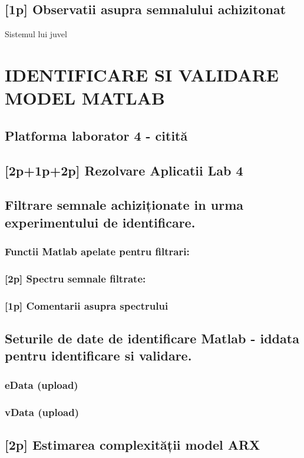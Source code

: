 \documentclass[12pt,english]{article}
\begin{document}
\subsection { [1p] Observatii asupra semnalului achizitonat }
Sistemul lui juvel

\section { IDENTIFICARE SI VALIDARE MODEL MATLAB }
\subsection { Platforma laborator 4 - citită                                  }
\subsection { [2p+1p+2p] Rezolvare Aplicatii Lab 4 }
\subsection { Filtrare semnale achiziționate in urma experimentului de identificare. }
\subsubsection { Functii Matlab apelate pentru filtrari: }
\subsubsection { [2p] Spectru semnale filtrate: }
\subsubsection { [1p] Comentarii asupra spectrului }
\subsection { Seturile de date de identificare Matlab - iddata pentru identificare si validare. }
\subsubsection { eData  (upload) }
\subsubsection { vData  (upload) }
\subsection { [2p] Estimarea complexității model ARX }
\end{document}
